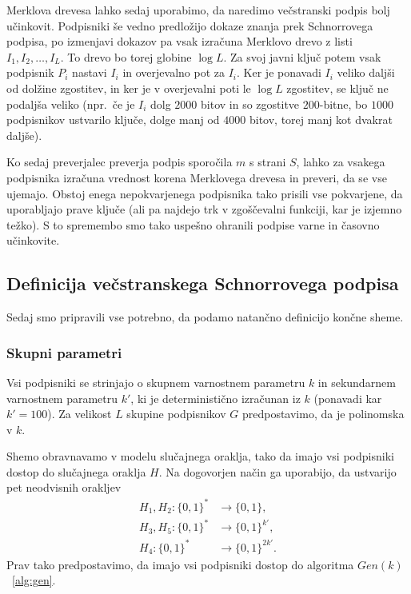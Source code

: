 \documentclass[isrm2, tisk]{fmfdelo}
\begin{document}
Merklova drevesa lahko sedaj uporabimo, da naredimo večstranski podpis bolj učinkovit. Podpisniki
še vedno predložijo dokaze znanja prek Schnorrovega podpisa, po izmenjavi dokazov pa vsak izračuna 
Merklovo drevo z listi $I_1, I_2, \dots, I_L$. To drevo bo torej globine $\log L$. Za svoj javni 
ključ potem vsak podpisnik $P_i$ nastavi $I_i$ in overjevalno pot za $I_i$. Ker je ponavadi $I_i$ 
veliko daljši od dolžine zgostitev, in ker je v overjevalni poti le $\log L$ zgostitev, se ključ 
ne podaljša veliko (npr.\, če je $I_i$ dolg $2000$ bitov in so zgostitve $200$-bitne, bo $1000$ 
podpisnikov ustvarilo ključe, dolge manj od $4000$ bitov, torej manj kot dvakrat daljše).

Ko sedaj preverjalec preverja podpis sporočila $m$ s strani $S$, lahko za vsakega podpisnika 
izračuna vrednost korena Merklovega drevesa in preveri, da se vse ujemajo. Obstoj enega nepokvarjenega
podpisnika tako prisili vse pokvarjene, da uporabljajo prave ključe (ali pa najdejo trk v 
zgoščevalni funkciji, kar je izjemno težko). S to spremembo smo tako uspešno ohranili podpise 
varne in časovno učinkovite.

\subsection{Definicija večstranskega Schnorrovega podpisa}
\label{sec:def_multi_schnorr}
Sedaj smo pripravili vse potrebno, da podamo natančno definicijo končne sheme. 

\subsubsection{Skupni parametri}
Vsi podpisniki se strinjajo o skupnem varnostnem parametru $k$ in sekundarnem varnostnem parametru
$k'$, ki je deterministično izračunan iz $k$ (ponavadi kar $k' = 100$). Za velikost $L$ skupine podpisnikov
$G$ predpostavimo, da je polinomska v $k$.

Shemo obravnavamo v modelu slučajnega oraklja, tako da imajo vsi podpisniki dostop do slučajnega
oraklja $H$. Na dogovorjen način ga uporabijo, da ustvarijo pet neodvisnih orakljev
\begin{align*}
    H_1, H_2: \{0, 1\}^* &\rightarrow \{0, 1\}, \\
    H_3, H_5: \{0, 1\}^* &\rightarrow \{0, 1\}^{k'}, \\
    H_4: \{0, 1\}^* &\rightarrow \{0, 1\}^{2k'}.
\end{align*}
Prav tako predpostavimo, da imajo vsi podpisniki dostop do algoritma $Gen(k)$~\ref{alg:gen}.
\end{document}
